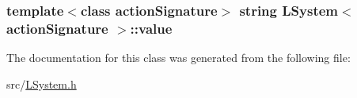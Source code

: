 \subsubsection[{\texorpdfstring{value}{value}}]{\setlength{\rightskip}{0pt plus 5cm}template$<$class action\+Signature$>$ string {\bf L\+System}$<$ action\+Signature $>$\+::value\hspace{0.3cm}{\ttfamily [protected]}}\hypertarget{class_l_system_a7d0159c166ac6443c592113393a5cbb6}{}\label{class_l_system_a7d0159c166ac6443c592113393a5cbb6}


The documentation for this class was generated from the following file\+:\begin{DoxyCompactItemize}
\item 
src/\hyperlink{_l_system_8h}{L\+System.\+h}\end{DoxyCompactItemize}
